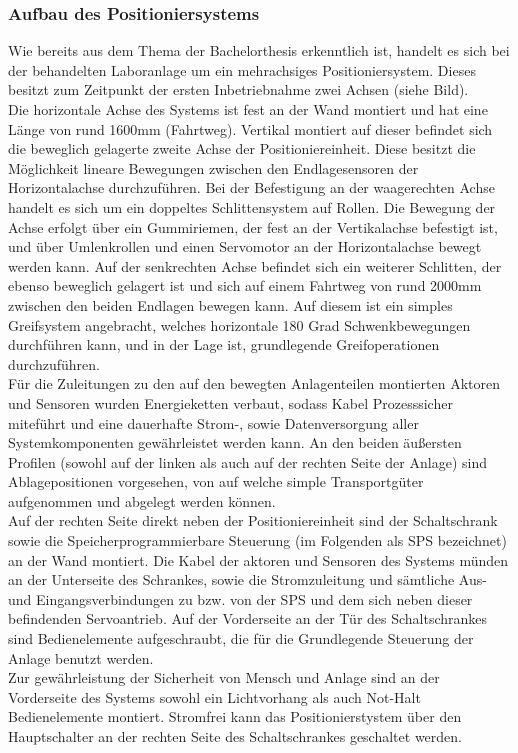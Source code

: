 \documentclass[../Bachelorarbeit.tex]{subfiles}
\begin{document}
\subsubsection{Aufbau des Positioniersystems}
Wie bereits aus dem Thema der Bachelorthesis erkenntlich ist, handelt es sich bei der behandelten Laboranlage um ein mehrachsiges Positioniersystem. Dieses besitzt zum Zeitpunkt der ersten Inbetriebnahme zwei Achsen (siehe Bild).\\
Die horizontale Achse des Systems ist fest an der Wand montiert und hat eine Länge von rund 1600mm (Fahrtweg). Vertikal montiert auf dieser befindet sich die beweglich gelagerte zweite Achse der Positioniereinheit. Diese besitzt die Möglichkeit lineare Bewegungen zwischen den Endlagesensoren der Horizontalachse durchzuführen. Bei der Befestigung an der waagerechten Achse handelt es sich um ein doppeltes Schlittensystem auf Rollen. Die Bewegung der Achse erfolgt über ein Gummiriemen, der fest an der Vertikalachse befestigt ist, und über Umlenkrollen und einen Servomotor an der Horizontalachse bewegt werden kann. Auf der senkrechten Achse befindet sich ein weiterer Schlitten, der ebenso beweglich gelagert ist und sich auf einem Fahrtweg von rund 2000mm zwischen den beiden Endlagen bewegen kann. Auf diesem ist ein simples Greifsystem angebracht, welches horizontale 180 Grad Schwenkbewegungen durchführen kann, und in der Lage ist, grundlegende Greifoperationen durchzuführen.\\
Für die Zuleitungen zu den auf den bewegten Anlagenteilen montierten Aktoren und Sensoren wurden Energieketten verbaut, sodass Kabel Prozesssicher miteführt und eine dauerhafte Strom-, sowie Datenversorgung aller Systemkomponenten gewährleistet werden kann. An den beiden äußersten Profilen (sowohl auf der linken als auch auf der rechten Seite der Anlage) sind Ablagepositionen vorgesehen, von \bzw auf welche simple Transportgüter aufgenommen und abgelegt werden können.\\
Auf der rechten Seite direkt neben der Positioniereinheit sind der Schaltschrank sowie die Speicherprogrammierbare Steuerung (im Folgenden als SPS bezeichnet) an der Wand montiert. Die Kabel der aktoren und Sensoren des Systems münden an der Unterseite des Schrankes, sowie die Stromzuleitung und sämtliche Aus- und Eingangsverbindungen zu bzw. von der SPS und dem sich neben dieser befindenden Servoantrieb. Auf der Vorderseite an der Tür des Schaltschrankes sind Bedienelemente aufgeschraubt, die für die Grundlegende Steuerung der Anlage benutzt werden.\\
Zur gewährleistung der Sicherheit von Mensch und Anlage sind an der Vorderseite des Systems sowohl ein Lichtvorhang als auch Not-Halt Bedienelemente montiert. Stromfrei kann das Positionierstystem über den Hauptschalter an der rechten Seite des Schaltschrankes geschaltet werden.
\end{document}
